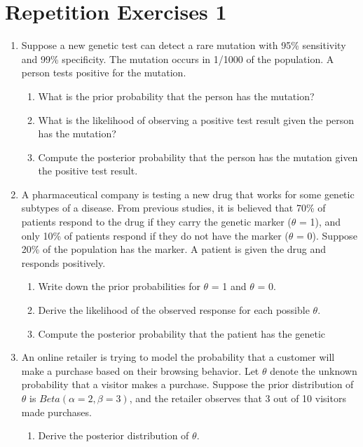 \documentclass[12pt,a4paper,twoside]{article}
\begin{document}
\section{Repetition Exercises 1}
\begin{enumerate}
    \item Suppose a new genetic test can detect a rare mutation with 95\% sensitivity and 99\%
    specificity. The mutation occurs in 1/1000 of the population. A person tests positive for
    the mutation.
    \begin{enumerate}[label=$(\alph*)$]
        \item What is the prior probability that the person has the mutation?
        \item What is the likelihood of observing a positive test result given the person has
        the mutation?
        \item Compute the posterior probability that the person has the mutation given the positive
        test result.
    \end{enumerate}
    \item A pharmaceutical company is testing a new drug that works for some genetic subtypes of a
    disease. From previous studies, it is believed that 70\% of patients respond to the drug if they
    carry the genetic marker ($\theta$ = 1), and only 10\% of patients respond if they do not have
    the marker ($\theta$ = 0). Suppose 20\% of the population has the marker. A patient is given the
    drug and responds positively.
    \begin{enumerate}[label=$(\alph*)$]
        \item Write down the prior probabilities for $\theta$ = 1 and $\theta$ = 0.
        \item Derive the likelihood of the observed response for each possible $\theta$.
        \item Compute the posterior probability that the patient has the genetic
    \end{enumerate}
    \item An online retailer is trying to model the probability that a customer will make a purchase
    based on their browsing behavior. Let $\theta$ denote the unknown probability that a visitor makes
    a purchase. Suppose the prior distribution of $\theta$ is $Beta(\alpha = 2, \beta = 3)$, and
    the retailer observes that 3 out of 10 visitors made purchases.
    \begin{enumerate}[label=$(\alph*)$]
        \item Derive the posterior distribution of $\theta$.

\end{enumerate}
\end{enumerate}
\end{document}
